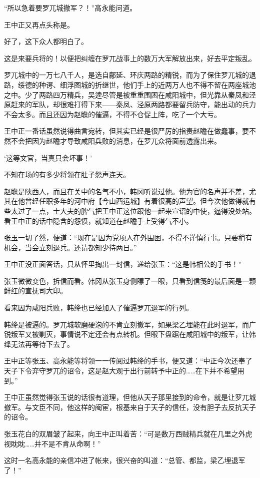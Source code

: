 “所以急着要罗兀城撤军？！”高永能问道。

王中正又再点头称是。

好了，这下众人都明白了。

这是来要兵将的！以便把纠缠在罗兀战事上的数万大军解放出来，好去平定叛乱。

罗兀城中的一万七八千人，是选自鄜延、环庆两路的精锐，而为了保住罗兀城的退路，绥德的种谔、细浮图城的折继世，他们手上的近两万人也不得不留在两座城池之中。少了两路四万精兵，吴逵尽管是被重重围困在咸阳城中，但光靠从秦凤和泾原赶来的军队，却很难打得下来——秦凤、泾原两路都要留兵防守，能出动的兵力不会太多。而且还因为赵瞻的催逼，不得不仓促上阵，吃了一个大亏。

王中正一番话虽然说得曲言宛转，但其实已经是很严厉的指责赵瞻在做蠢事，要不然不会把因为赵瞻才导致咸阳兵败的消息，在罗兀众将面前透露出来。

‘这等文官，当真只会坏事！’

不知在场的有多少将领在肚子怨声连天。

赵瞻是陕西人，而且在关中的名气不小，韩冈听说过他。他为官的名声并不差，尤其在他曾经任职多年的河中府【今山西运城】有着很高的声望。但今次他做得就有些太过了一点，士大夫的脾气把王中正这位跟他一起来宣诏的中使，逼得没处站。看王中正的话中隐含的怨愤，就知道在赵瞻手上受得气不小。

张玉一切了然，便道：“现在是因为党项人在外围困，不得不谨慎行事。只要稍有机会，当会立刻退兵。还请都知少待两日。”

王中正没正面答话，只从怀里掏出一封信，递给张玉：“这是韩相公的手书！”

张玉微微变色，拆信而看。韩冈从张玉身侧瞟了一眼，只看到信笺的最后面是一颗鲜红的宣抚司大印。

看来因为咸阳兵败，韩绛也已经加入了催逼罗兀退军的行列。

韩绛是被逼的。罗兀城软磨硬泡的不肯立刻撤军，如果梁乙埋能在此时退军，而广锐叛军又被剿灭，事情说不定还会有点转机。但眼下盘踞在咸阳城中的叛军，让韩绛无法再等待下去了。

王中正等张玉、高永能等将领一一传阅过韩绛的手书，便又道：“中正今次还奉了天子下令弃守罗兀的诏令，这是赵大观于出行前转予中正的……在下并不希望用到。”

王中正虽然觉得张玉说的话很有道理，但他从天子那里接到的命令，就是让罗兀城撤军。与文臣不同，他这样的阉宦，根基来自于天子的信任，没有胆子去反抗天子的诏令。

张玉花白的双眉皱了起来，向王中正叫着苦：“可是数万西贼精兵就在几里之外虎视眈眈……并不是不肯从命啊！”

这时一名高永能的亲信冲进了帐来，很兴奋的叫道：“总管、都监，梁乙埋退军了！”

